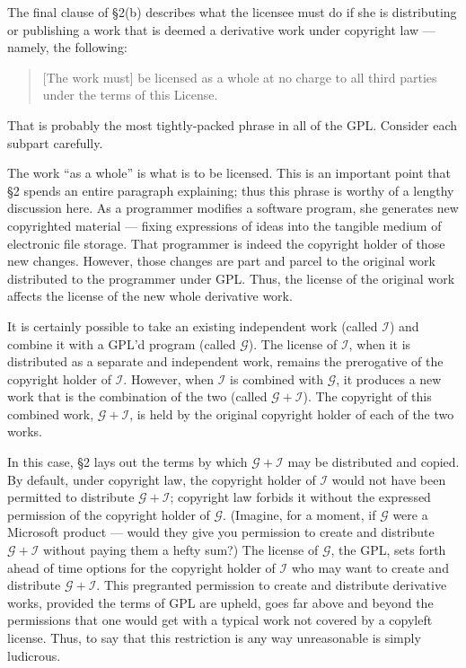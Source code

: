 \documentclass[11pt, letterpaper]{book}
\begin{document}
The final clause of \S 2(b) describes what the licensee must do if she is
distributing or publishing a work that is deemed a derivative work under
copyright law --- namely, the following:
\begin{quote}
[The work must] be licensed as a whole at no charge to all third parties
under the terms of this License.
\end{quote}
That is probably the most tightly-packed phrase in all of the GPL\@.
Consider each subpart carefully.

The work ``as a whole'' is what is to be licensed. This is an important
point that \S 2 spends an entire paragraph explaining; thus this phrase is
worthy of a lengthy discussion here. As a programmer modifies a software
program, she generates new copyrighted material --- fixing expressions of
ideas into the tangible medium of electronic file storage. That
programmer is indeed the copyright holder of those new changes. However,
those changes are part and parcel to the original work distributed to
the programmer under GPL\@. Thus, the license of the original work
affects the license of the new whole derivative work.

\newcommand{\gplusi}{$\mathcal{G\!\!+\!\!I}$}
\newcommand{\worki}{$\mathcal{I}$}
\newcommand{\workg}{$\mathcal{G}$}

\label{separate-and-independent}

It is certainly possible to take an existing independent work (called
\worki{}) and combine it with a GPL'd program (called \workg{}). The
license of \worki{}, when it is distributed as a separate and independent
work, remains the prerogative of the copyright holder of \worki{}.
However, when \worki{} is combined with \workg{}, it produces a new work
that is the combination of the two (called \gplusi{}). The copyright of
this combined work, \gplusi{}, is held by the original copyright
holder of each of the two works.

In this case, \S 2 lays out the terms by which \gplusi{} may be
distributed and copied. By default, under copyright law, the copyright
holder of \worki{} would not have been permitted to distribute \gplusi{};
copyright law forbids it without the expressed permission of the copyright
holder of \workg{}. (Imagine, for a moment, if \workg{} were a Microsoft
product --- would they give you permission to create and distribute
\gplusi{} without paying them a hefty sum?)  The license of \workg{}, the
GPL, sets forth ahead of time options for the copyright holder of \worki{}
who may want to create and distribute \gplusi{}. This pregranted
permission to create and distribute derivative works, provided the terms
of GPL are upheld, goes far above and beyond the permissions that one
would get with a typical work not covered by a copyleft license. Thus, to
say that this restriction is any way unreasonable is simply ludicrous.
\end{document}

